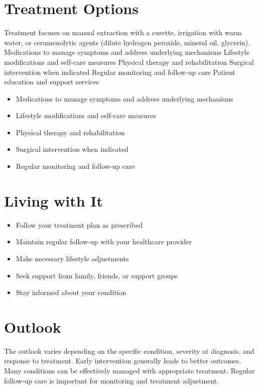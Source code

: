 \section{Treatment Options}
Treatment focuses on manual extraction with a curette, irrigation with warm water, or cerumenolytic agents (dilute hydrogen peroxide, mineral oil, glycerin). Medications to manage symptoms and address underlying mechanisms Lifestyle modifications and self-care measures Physical therapy and rehabilitation Surgical intervention when indicated Regular monitoring and follow-up care Patient education and support services

\begin{itemize}[noitemsep]
  \item Medications to manage symptoms and address underlying mechanisms
  \item Lifestyle modifications and self-care measures
  \item Physical therapy and rehabilitation
  \item Surgical intervention when indicated
  \item Regular monitoring and follow-up care
\end{itemize}
\section{Living with It}
\begin{itemize}[noitemsep]
  \item Follow your treatment plan as prescribed
  \item Maintain regular follow-up with your healthcare provider
  \item Make necessary lifestyle adjustments
  \item Seek support from family, friends, or support groups
  \item Stay informed about your condition
\end{itemize}
\section{Outlook}
The outlook varies depending on the specific condition, severity at diagnosis, and response to treatment. Early intervention generally leads to better outcomes. Many conditions can be effectively managed with appropriate treatment. Regular follow-up care is important for monitoring and treatment adjustment.
